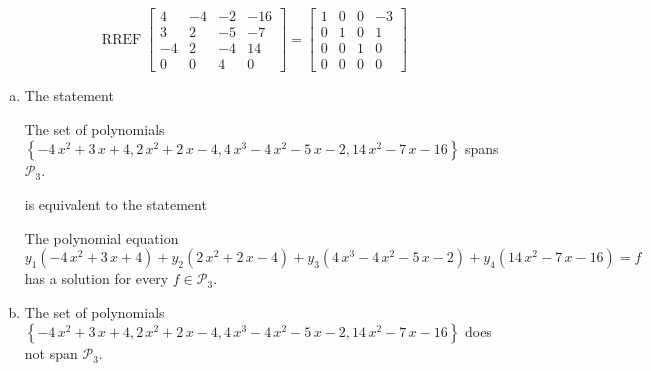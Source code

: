 \begin{exerciseAnswer} 


\[\operatorname{RREF} \left[\begin{array}{cccc}
4 & -4 & -2 & -16 \\
3 & 2 & -5 & -7 \\
-4 & 2 & -4 & 14 \\
0 & 0 & 4 & 0
\end{array}\right] = \left[\begin{array}{cccc}
1 & 0 & 0 & -3 \\
0 & 1 & 0 & 1 \\
0 & 0 & 1 & 0 \\
0 & 0 & 0 & 0
\end{array}\right] \]


\begin{enumerate}[(a)]
\item The statement 
\begin{center}\begin{minipage}{0.8\textwidth}
 The set of polynomials \( \left\{ -4 \, x^{2} + 3 \, x + 4 , 2 \, x^{2} + 2 \, x - 4 , 4 \, x^{3} - 4 \, x^{2} - 5 \, x - 2 , 14 \, x^{2} - 7 \, x - 16 \right\} \) spans \(\mathcal{P}_3\). 
\end{minipage}\end{center}
     is equivalent to the statement 
\begin{center}\begin{minipage}{0.8\textwidth}
 The polynomial equation \[ y_{1} \left( -4 \, x^{2} + 3 \, x + 4 \right) + y_{2} \left( 2 \, x^{2} + 2 \, x - 4 \right) + y_{3} \left( 4 \, x^{3} - 4 \, x^{2} - 5 \, x - 2 \right) + y_{4} \left( 14 \, x^{2} - 7 \, x - 16 \right) =f\] has a solution for every \(f \in \mathcal{P}_3\). 
\end{minipage}\end{center}
    
\item The set of polynomials \( \left\{ -4 \, x^{2} + 3 \, x + 4 , 2 \, x^{2} + 2 \, x - 4 , 4 \, x^{3} - 4 \, x^{2} - 5 \, x - 2 , 14 \, x^{2} - 7 \, x - 16 \right\} \) does not span \(\mathcal{P}_3\). 
\end{enumerate}
    
\end{exerciseAnswer}
    
